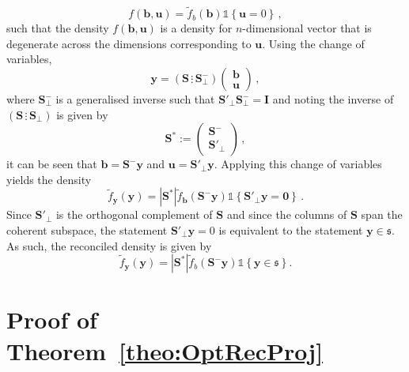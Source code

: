 \documentclass[12pt]{article}
\theoremstyle{definition}
\begin{document}
\begin{equation}
f(\bm{b},\bm{u})=\tilde{f}_b(\bm{b})\mathbb{1}\left\{\bm{u}=0\right\}\,,
\end{equation}
such that the density $f(\bm{b},\bm{u})$ is a density for $n$-dimensional vector that is degenerate across the dimensions corresponding to $\bm{u}$.  Using the change of variables,
\[
\bm{y}=\left(\bm{S}\,\vdots\,\bm{S}^-_{\perp}\right)\begin{pmatrix}\bm{b}\\\bm{u}
\end{pmatrix}\,,
\]
where $\bm{S}^-_{\perp}$ is a generalised inverse such that $\bm{S}'_{\perp}\bm{S}^-_{\perp}=\bm{I}$ and noting the inverse of $\left(\bm{S}\,\vdots\,\bm{S}_{\perp}\right)$ is given by
\[
\bm{S}^*:=\begin{pmatrix}\bm{S}^{-}\\\bm{S}'_{\perp}\end{pmatrix}\,,
\]
it can be seen that $\bm{b}=\bm{S}^-\bm{y}$ and $\bm{u}=\bm{S}'_\perp\bm{y}$.  Applying this change of variables yields the density
\[
\tilde{f}_{\bm{y}}(\bm{y})=|\bm{S}^*|\tilde{f}_{\bm b}(\bm{S}^-\bm{y})\mathbb{1}\left\{\bm{S}'_\perp\bm{y}=\bm{0}\right\}\,.
\]
Since $\bm{S}'_\perp$ is the orthogonal complement of $\bm{S}$ and since the columns of $\bm{S}$ span the coherent subspace, the statement $\bm{S}'_\perp\bm{y}=0$ is equivalent to the statement $\bm{y}\in\mathfrak{s}$.  As such, the reconciled density is given by
\[
\tilde{f}_{\bm{y}}(\bm{y})=|\bm{S}^*|\tilde{f}_b(\bm{S}^-\bm{y})\mathbb{1}\left\{\bm{y}\in\mathfrak{s}\right\}.
\]
\clearpage
\section{Proof of Theorem~\ref{theo:OptRecProj}}
\label{app:OptRecProj}
\end{document}
